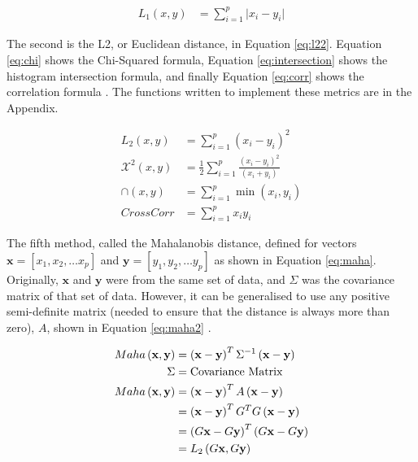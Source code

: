 \documentclass[a4paper, 10pt, conference]{ieeeconf}
\begin{document}
\begin{align}
  L_1 \left( x, y \right) &= \sum_{i = 1}^{p} \lvert x_i  - y_i \rvert \label{eq:l1}
\end{align}

The second is the L2, or Euclidean distance, in Equation \ref{eq:l22}. Equation \ref{eq:chi} shows the Chi-Squared formula, Equation \ref{eq:intersection} shows the histogram intersection formula, and finally Equation \ref{eq:corr} shows the correlation formula \cite{metrics}. The functions written to implement these metrics are in the Appendix.

\begin{align}
  L_2 \left( x, y \right) &= \sum_{i = 1}^{p} \left( x_i  - y_i \right) ^2 \label{eq:l22}\\
  \mathcal{X}^2 \left( x, y \right) &= \frac{1}{2} \sum_{i = 1}^{p} \frac{\left( x_i - y_i \right) ^2 }{\left( x_i + y_i \right)} \label{eq:chi}\\
  \cap \left( x, y \right) &= \sum_{i = 1}^{p} \min \left( x_i, y_i \right) \label{eq:intersection}\\
  CrossCorr &= \sum_{i = 1}^{p} x_i y_i \label{eq:corr}
\end{align}

The fifth method, called the Mahalanobis distance, defined for vectors $\mathbf{x} = [x_1, x_2, \ldots x_p]$ and $\mathbf{y} = [y_1, y_2, \ldots y_p]$ as shown in Equation \ref{eq:maha}. Originally, $\mathbf{x}$ and $\mathbf{y}$ were from the same set of data, and $\Sigma$ was the covariance matrix of that set of data. However, it can be generalised to use any positive semi-definite matrix (needed to ensure that the distance is always more than zero), $A$, shown in Equation \ref{eq:maha2} \cite{metrics}.

\begin{align}
  Maha \left( \mathbf{x}, \mathbf{y} \right) &= \left( \mathbf{x} - \mathbf{y} \right) ^T \Sigma^{-1} \left( \mathbf{x} - \mathbf{y} \right)\label{eq:maha}\\
  \Sigma &= \text{Covariance Matrix}\notag\\
  Maha \left( \mathbf{x}, \mathbf{y} \right)&= \left( \mathbf{x} - \mathbf{y} \right) ^T A \left( \mathbf{x} - \mathbf{y}\right)\label{eq:maha2}\\
  &= \left( \mathbf{x} - \mathbf{y} \right) ^T G^T G \left( \mathbf{x} - \mathbf{y}\right)\notag\\
  &= \left( G\mathbf{x} - G\mathbf{y} \right) ^T \left( G\mathbf{x} - G\mathbf{y}\right)\notag\\
  &= L_2\left( G\mathbf{x}, G\mathbf{y} \right) \label{eq:maha3}
\end{align}
\end{document}
